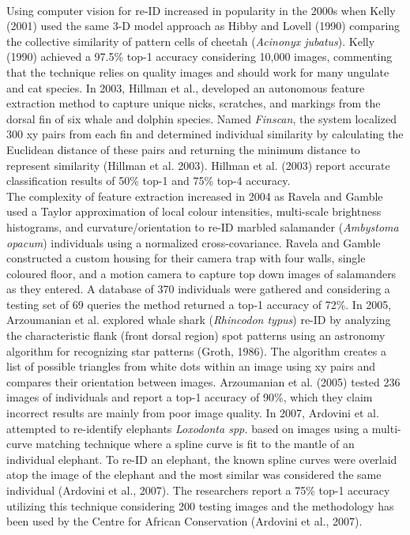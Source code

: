 \documentclass[11pt]{article}
\begin{document}
\newline
\\
Using computer vision for re-ID increased in popularity in the 2000s when Kelly (2001) used the same 3-D model approach as Hibby and Lovell (1990) comparing the collective similarity of pattern cells of cheetah (\textit{Acinonyx jubatus}). Kelly (1990) achieved a 97.5\% top-1 accuracy considering 10,000 images, commenting that the technique relies on quality images and should work for many ungulate and cat species. In 2003, Hillman et al., developed an autonomous feature extraction method to capture unique nicks, scratches, and markings from the dorsal fin of six whale and dolphin species. Named \textit{Finscan}, the system localized 300 xy pairs from each fin and determined individual similarity by calculating the Euclidean distance of these pairs and returning the minimum distance to represent similarity (Hillman et al. 2003). Hillman et al. (2003) report accurate classification results of 50\% top-1 and 75\% top-4 accuracy.
\newline
\\
The complexity of feature extraction increased in 2004 as Ravela and Gamble used a Taylor approximation of local colour intensities, multi-scale brightness histograms, and curvature/orientation to re-ID marbled salamander (\textit{Ambystoma opacum}) individuals using a normalized cross-covariance. Ravela and Gamble constructed a custom housing for their camera trap with four walls, single coloured floor, and a motion camera to capture top down images of salamanders as they entered. A database of 370 individuals were gathered and considering a testing set of 69 queries the method returned a top-1 accuracy of 72\%. In 2005, Arzoumanian et al. explored whale shark (\textit{Rhincodon typus}) re-ID by analyzing the characteristic flank (front dorsal region) spot patterns using an astronomy algorithm for recognizing star patterns (Groth, 1986). The algorithm creates a list of possible triangles from white dots within an image using xy pairs and compares their orientation between images. Arzoumanian et al. (2005) tested 236 images of individuals and report a top-1 accuracy of 90\%, which they claim incorrect results are mainly from poor image quality. In 2007, Ardovini et al. attempted to re-identify elephants \textit{Loxodonta spp.} based on images using a multi-curve matching technique where a spline curve is fit to the mantle of an individual elephant. To re-ID an elephant, the known spline curves were overlaid atop the image of the elephant and the most similar was considered the same individual (Ardovini et al., 2007). The researchers report a 75\% top-1 accuracy utilizing this technique considering 200 testing images and the methodology has been used by the Centre for African Conservation (Ardovini et al., 2007).
\end{document}
